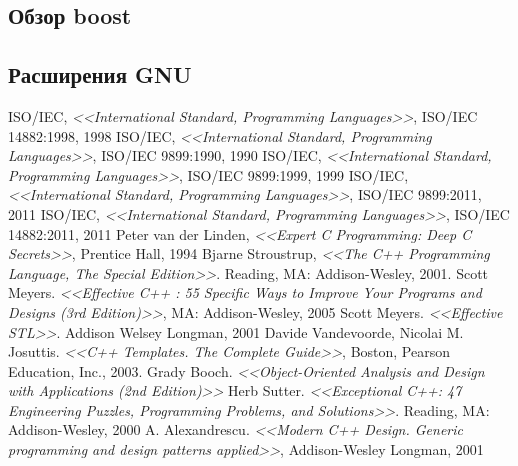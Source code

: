 \documentclass[a4paper,12pt,oneside]{article}
\begin{document}
\subsection{Обзор boost}

\subsection{Расширения GNU}

\pagebreak
{}
\listoffigures

\pagebreak
{}
\begin{thebibliography}{99}
 ISO/IEC, \textit{<<International Standard, Programming Languages>>}, ISO/IEC 14882:1998, 1998
 ISO/IEC, \textit{<<International Standard, Programming Languages>>}, ISO/IEC 9899:1990, 1990
 ISO/IEC, \textit{<<International Standard, Programming Languages>>}, ISO/IEC 9899:1999, 1999
 ISO/IEC, \textit{<<International Standard, Programming Languages>>}, ISO/IEC 9899:2011, 2011
 ISO/IEC, \textit{<<International Standard, Programming Languages>>}, ISO/IEC 14882:2011, 2011
 Peter van der Linden, \textit{<<Expert C Programming: Deep C Secrets>>}, Prentice Hall, 1994
 Bjarne Stroustrup, \textit{<<The C++ Programming Language, The Special Edition>>}. Reading, MA: Addison-Wesley, 2001.
 Scott Meyers. \textit{<<Effective C++ : 55 Specific Ways to Improve Your Programs and Designs (3rd Edition)>>}, MA: Addison-Wesley, 2005
 Scott Meyers. \textit{<<Effective STL>>}. Addison Welsey Longman, 2001
 Davide Vandevoorde, Nicolai M. Josuttis. \textit{<<C++ Templates. The Complete Guide>>}, Boston, Pearson Education, Inc., 2003.
 Grady Booch. \textit{<<Object-Oriented Analysis and Design with Applications (2nd Edition)>>}
 Herb Sutter. \textit{<<Exceptional C++: 47 Engineering Puzzles, Programming Problems, and Solutions>>}. Reading, MA: Addison-Wesley, 2000
 A. Alexandrescu. \textit{<<Modern C++ Design. Generic programming and design patterns applied>>}, Addison-Wesley Longman, 2001
\end{thebibliography}

\pagebreak
{}
\printindex
\end{document}
